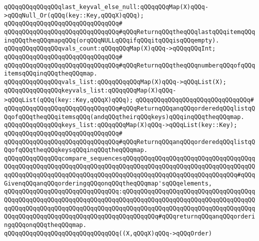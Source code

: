 \verb|qQQqqQQqqQQqqQQqlast_keyval_else_null:qQQqqQQqMap(X)qQQq->qQQqNull_Or(qQQq(key::Key,qQQqX)qQQq);|\newline
\verb|qQQqqQQqqQQqqQQqqQQqqQQqqQQqqQQq#|\newline
\verb|qQQqqQQqqQQqqQQqqQQqqQQqqQQqqQQq#qQQqReturnqQQqtheqQQqlastqQQqitemqQQqinqQQqtheqQQqmapqQQq(orqQQqNULLqQQqifqQQqitqQQqisqQQqempty).|\newline
\newline
\verb|qQQqqQQqqQQqqQQqvals_count:qQQqqQQqMap(X)qQQq->qQQqqQQqInt;|\newline
\verb|qQQqqQQqqQQqqQQqqQQqqQQqqQQqqQQq#|\newline
\verb|qQQqqQQqqQQqqQQqqQQqqQQqqQQqqQQq#qQQqReturnqQQqtheqQQqnumberqQQqofqQQqitemsqQQqinqQQqtheqQQqmap.|\newline
\newline
\verb|qQQqqQQqqQQqqQQqvals_list:qQQqqQQqqQQqMap(X)qQQq->qQQqList(X);|\newline
\verb|qQQqqQQqqQQqqQQqkeyvals_list:qQQqqQQqMap(X)qQQq->qQQqList(qQQq(key::Key,qQQqX)qQQq);|\newline
\verb|qQQqqQQqqQQqqQQqqQQqqQQqqQQqqQQq#|\newline
\verb|qQQqqQQqqQQqqQQqqQQqqQQqqQQqqQQq#qQQqReturnqQQqanqQQqorderedqQQqlistqQQqofqQQqtheqQQqitemsqQQq(andqQQqtheirqQQqkeys)qQQqinqQQqtheqQQqmap.|\newline
\newline
\verb|qQQqqQQqqQQqqQQqkeys_list:qQQqqQQqMap(X)qQQq->qQQqList(key::Key);|\newline
\verb|qQQqqQQqqQQqqQQqqQQqqQQqqQQqqQQq#|\newline
\verb|qQQqqQQqqQQqqQQqqQQqqQQqqQQqqQQq#qQQqReturnqQQqanqQQqorderedqQQqlistqQQqofqQQqtheqQQqkeysqQQqinqQQqtheqQQqmap.|\newline
\newline
\verb|qQQqqQQqqQQqqQQqcompare_sequencesqQQqqQQqqQQqqQQqqQQqqQQqqQQqqQQqqQQqqQQqqQQqqQQqqQQqqQQqqQQqqQQqqQQqqQQqqQQqqQQqqQQqqQQqqQQqqQQqqQQqqQQqqQQqqQQqqQQqqQQqqQQqqQQqqQQqqQQqqQQqqQQqqQQqqQQqqQQqqQQqqQQqqQQqqQQq#qQQqGivenqQQqanqQQqorderingqQQqonqQQqtheqQQqmap'sqQQqelements,|\newline
\verb|qQQqqQQqqQQqqQQqqQQqqQQqqQQqqQQq:qQQqqQQqqQQqqQQqqQQqqQQqqQQqqQQqqQQqqQQqqQQqqQQqqQQqqQQqqQQqqQQqqQQqqQQqqQQqqQQqqQQqqQQqqQQqqQQqqQQqqQQqqQQqqQQqqQQqqQQqqQQqqQQqqQQqqQQqqQQqqQQqqQQqqQQqqQQqqQQqqQQqqQQqqQQqqQQqqQQqqQQqqQQqqQQqqQQqqQQqqQQqqQQqqQQqqQQqqQQq#qQQqreturnqQQqanqQQqorderingqQQqonqQQqtheqQQqmap.|\newline
\verb|qQQqqQQqqQQqqQQqqQQqqQQqqQQqqQQq((X,qQQqX)qQQq->qQQqOrder)|\newline
